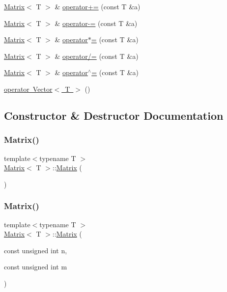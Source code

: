 \begin{DoxyCompactItemize}
\item 
\mbox{\hyperlink{classMatrix}{Matrix}}$<$ T $>$ \& \mbox{\hyperlink{classMatrix_a5aeaf1a90547b2288646d57143d5518c}{operator+=}} (const T \&a)
\item 
\mbox{\hyperlink{classMatrix}{Matrix}}$<$ T $>$ \& \mbox{\hyperlink{classMatrix_a8776d41fcbbc1fc08425492576cf6786}{operator-\/=}} (const T \&a)
\item 
\mbox{\hyperlink{classMatrix}{Matrix}}$<$ T $>$ \& \mbox{\hyperlink{classMatrix_a9ac358ade86c1b442aa75852b2dd663a}{operator$\ast$=}} (const T \&a)
\item 
\mbox{\hyperlink{classMatrix}{Matrix}}$<$ T $>$ \& \mbox{\hyperlink{classMatrix_ada3039797826038262e03da2ee3a8697}{operator/=}} (const T \&a)
\item 
\mbox{\hyperlink{classMatrix}{Matrix}}$<$ T $>$ \& \mbox{\hyperlink{classMatrix_af35faeb39342bf42c4470cf10630e32f}{operator$^\wedge$=}} (const T \&a)
\item 
\mbox{\hyperlink{classMatrix_a8d390e8b2581c65774f58a0a3b716dcb}{operator Vector$<$ T $>$}} ()
\end{DoxyCompactItemize}


\subsection{Constructor \& Destructor Documentation}
\mbox{\label{classMatrix_a9d567e3a121b1be0c3f9c461cab524fe}} 
\subsubsection{\texorpdfstring{Matrix()}{Matrix()}\hspace{0.1cm}{\footnotesize\ttfamily [1/7]}}
{\footnotesize\ttfamily template$<$typename T $>$ \\
\mbox{\hyperlink{classMatrix}{Matrix}}$<$ T $>$\+::\mbox{\hyperlink{classMatrix}{Matrix}} (\begin{DoxyParamCaption}{ }\end{DoxyParamCaption})}

\mbox{\label{classMatrix_ac8061527f81abb94e19b1ac6fd4af63a}} 
\subsubsection{\texorpdfstring{Matrix()}{Matrix()}\hspace{0.1cm}{\footnotesize\ttfamily [2/7]}}
{\footnotesize\ttfamily template$<$typename T $>$ \\
\mbox{\hyperlink{classMatrix}{Matrix}}$<$ T $>$\+::\mbox{\hyperlink{classMatrix}{Matrix}} (\begin{DoxyParamCaption}\item[{const unsigned int}]{n,  }\item[{const unsigned int}]{m }\end{DoxyParamCaption})}

